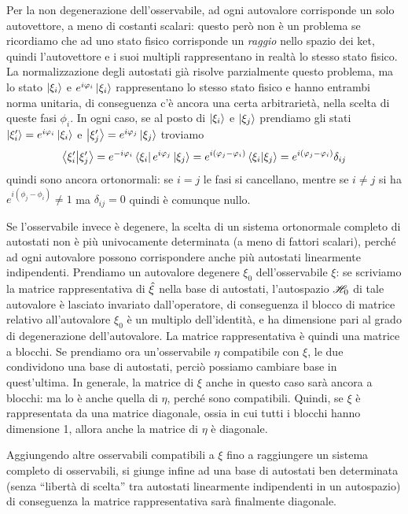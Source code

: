 Per la non degenerazione dell'osservabile, ad ogni autovalore corrisponde un solo autovettore, a meno di costanti scalari: questo però non è un problema se ricordiamo che ad uno stato fisico corrisponde un \emph{raggio} nello spazio dei ket, quindi l'autovettore e i suoi multipli rappresentano in realtà lo stesso stato fisico.
La normalizzazione degli autostati già risolve parzialmente questo problema, ma lo stato $\left|{\xi_i}\right\rangle$ e $e^{i\varphi_i}\left|{\xi_i}\right\rangle$ rappresentano lo stesso stato fisico e hanno entrambi norma unitaria, di conseguenza c'è ancora una certa arbitrarietà, nella scelta di queste fasi $\phi_i$.
In ogni caso, se al posto di $\left|{\xi_i}\right\rangle$ e $\left|{\xi_j}\right\rangle$ prendiamo gli stati $\left|{\xi_i'}\right\rangle=e^{i\varphi_i}\left|{\xi_i}\right\rangle$ e $\left|{\xi_j'}\right\rangle=e^{i\varphi_j}\left|{\xi_j}\right\rangle$ troviamo
\begin{equation}
	\left\langle{\xi_i'}\middle|{\xi_j'}\right\rangle=e^{-i\varphi_i}\left\langle{\xi_i}\right|e^{i\varphi_j}\left|{\xi_j}\right\rangle=e^{i(\varphi_j-\varphi_i)}\left\langle{\xi_i}\middle|{\xi_j}\right\rangle=e^{i(\varphi_j-\varphi_i)}\delta_{ij}
\end{equation}
quindi sono ancora ortonormali: se $i=j$ le fasi si cancellano, mentre se $i\ne j$ si ha $e^{i(\phi_j-\phi_i)}\ne 1$ ma $\delta_{ij}=0$ quindi è comunque nullo.

Se l'osservabile invece è degenere, la scelta di un sistema ortonormale completo di autostati non è più univocamente determinata (a meno di fattori scalari), perch\'e ad ogni autovalore possono corrispondere anche più autostati linearmente indipendenti.
Prendiamo un autovalore degenere $\xi_0$ dell'osservabile $\xi$: se scriviamo la matrice rappresentativa di $\hat{\xi}$ nella base di autostati, l'autospazio $\mathscr H_0$ di tale autovalore è lasciato invariato dall'operatore, di conseguenza il blocco di matrice relativo all'autovalore $\xi_0$ è un multiplo dell'identità, e ha dimensione pari al grado di degenerazione dell'autovalore.
La matrice rappresentativa è quindi una matrice a blocchi.
Se prendiamo ora un'osservabile $\eta$ compatibile con $\xi$, le due condividono una base di autostati, perciò possiamo cambiare base in quest'ultima.
In generale, la matrice di $\xi$ anche in questo caso sarà ancora a blocchi: ma lo è anche quella di $\eta$, perch\'e sono compatibili.
Quindi, se $\xi$ è rappresentata da una matrice diagonale, ossia in cui tutti i blocchi hanno dimensione 1, allora anche la matrice di $\eta$ è diagonale.

Aggiungendo altre osservabili compatibili a $\xi$ fino a raggiungere un sistema completo di osservabili, si giunge infine ad una base di autostati ben determinata (senza ``libertà di scelta'' tra autostati linearmente indipendenti in un autospazio) di conseguenza la matrice rappresentativa sarà finalmente diagonale.

